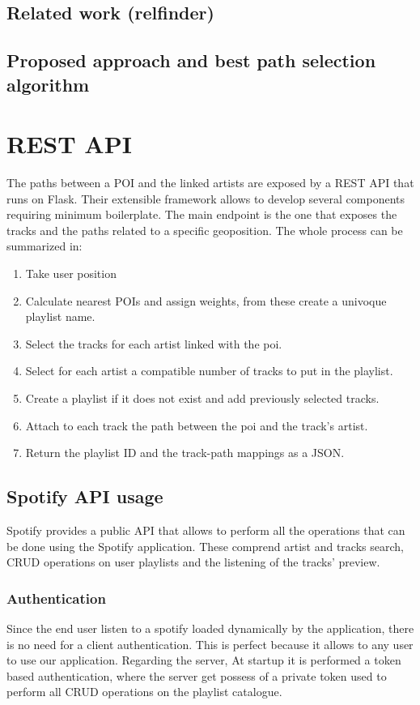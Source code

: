 \subsection{Related work (relfinder)}
\subsection{Proposed approach and best path selection algorithm}
\section{REST API}
The paths between a POI and the linked artists are exposed by a REST API that runs on Flask. Their extensible framework allows to develop several components requiring minimum boilerplate.
The main endpoint is the one that exposes the tracks and the paths related to a specific geoposition.
The whole process can be summarized in:
\begin{enumerate}
\item Take user position
\item Calculate nearest POIs and assign weights, from these create a univoque playlist name.
\item Select the tracks for each artist linked with the poi.
\item Select for each artist a compatible number of tracks to put in the playlist.
\item Create a playlist if it does not exist and add previously selected tracks.
\item Attach to each track the path between the poi and the track's artist.
\item Return the playlist ID and the track-path mappings as a JSON.
\end{enumerate}
\subsection{Spotify API usage}
Spotify provides a public API that allows to perform all the operations that can be done using the Spotify application. These comprend artist and tracks search, CRUD operations on user playlists and the listening of the tracks' preview.
\subsubsection{Authentication}
Since the end user listen to a spotify loaded dynamically by the application, there is no need for a client authentication. This is perfect because it allows to any user to use our application. Regarding the server, At startup it is performed a token based authentication, where the server get possess of a private token used to perform all CRUD operations on the playlist catalogue.
